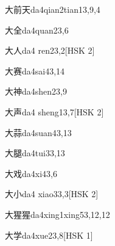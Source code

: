 \begin{entry}{大前天}{da4qian2tian1}{3,9,4}
\end{entry}

\begin{entry}{大全}{da4quan2}{3,6}
\end{entry}

\begin{entry}{大人}{da4 ren2}{3,2}[HSK 2]
\end{entry}

\begin{entry}{大赛}{da4sai4}{3,14}
\end{entry}

\begin{entry}{大神}{da4shen2}{3,9}
\end{entry}

\begin{entry}{大声}{da4 sheng1}{3,7}[HSK 2]
\end{entry}

\begin{entry}{大蒜}{da4suan4}{3,13}
\end{entry}

\begin{entry}{大腿}{da4tui3}{3,13}
\end{entry}

\begin{entry}{大戏}{da4xi4}{3,6}
\end{entry}

\begin{entry}{大小}{da4 xiao3}{3,3}[HSK 2]
\end{entry}

\begin{entry}{大猩猩}{da4xing1xing5}{3,12,12}
\end{entry}

\begin{entry}{大学}{da4xue2}{3,8}[HSK 1]
\end{entry}

